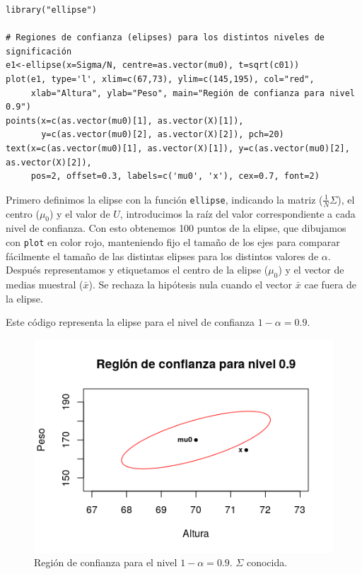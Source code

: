 \documentclass[12pt]{article}
\begin{document}
\begin{verbatim}
library("ellipse")

# Regiones de confianza (elipses) para los distintos niveles de significación
e1<-ellipse(x=Sigma/N, centre=as.vector(mu0), t=sqrt(c01))
plot(e1, type='l', xlim=c(67,73), ylim=c(145,195), col="red",
     xlab="Altura", ylab="Peso", main="Región de confianza para nivel 0.9")
points(x=c(as.vector(mu0)[1], as.vector(X)[1]),
       y=c(as.vector(mu0)[2], as.vector(X)[2]), pch=20)
text(x=c(as.vector(mu0)[1], as.vector(X)[1]), y=c(as.vector(mu0)[2], as.vector(X)[2]),
     pos=2, offset=0.3, labels=c('mu0', 'x'), cex=0.7, font=2)
\end{verbatim}

Primero definimos la elipse con la función \texttt{ellipse}, indicando
la matriz ($\frac{1}{N}\Sigma$), el centro ($\mu_0$) y el valor de
$U$, introducimos la raíz del valor correspondiente a cada nivel de
confianza. Con esto obtenemos 100 puntos de la elipse, que dibujamos
con \texttt{plot} en color rojo, manteniendo fijo el tamaño de los
ejes para comparar fácilmente el tamaño de las distintas elipses para
los distintos valores de $\alpha$. Después representamos y etiquetamos
el centro de la elipse ($\mu_0$) y el vector de medias muestral
($\bar{x}$). Se rechaza la hipótesis nula cuando el vector $\bar{x}$
cae fuera de la elipse.

Este código representa la elipse para el nivel de confianza $1-\alpha=0.9$.
\vspace{-4mm}
\begin{figure}[H]
  \centering
  \includegraphics[width=120mm]{elipses/con-01}
  \caption{Región de confianza para el nivel $1-\alpha=0.9$. $\Sigma$ conocida.}
  \label{fig:con-01}
\end{figure}
\end{document}
